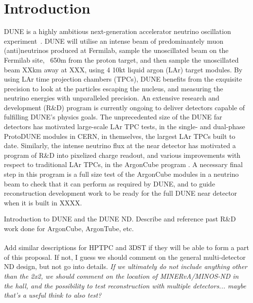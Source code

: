 \section{Introduction}
\label{sec:introduction}

DUNE is a highly ambitious next-generation accelerator neutrino oscillation experiment~\addcite. DUNE will utilise an intense beam of predominantely muon (anti)neutrinos produced at Fermilab, sample the unoscillated beam on the Fermilab site, ~650m  from the proton target, and then sample the unoscillated beam XXkm away at XXX, using 4 10kt liquid argon (LAr) target modules. By using LAr time projection chambers (TPCs), DUNE benefits from the exquisite precision to look at the particles escaping the nucleus, and measuring the neutrino energies with unparalleled precision.  An extensive research and development (R\&D) program is currently ongoing to deliver detectors capable of fulfilling DUNE's physics goals. The unprecedented size of the DUNE far detectors has motivated large-scale LAr TPC tests, in the single- and dual-phase ProtoDUNE modules in CERN, in themselves, the largest LAr TPCs built to date. Similarly, the intense neutrino flux at the near detector has motivated a program of R\&D into pixelized charge readout, and various improvements with respect to traditional LAr TPCs, in the ArgonCube program . A necessary final step in this program is a full size test of the ArgonCube modules  in a neutrino beam to check that it can perform as required by DUNE, and to guide reconstruction development work to be ready for the full DUNE near detector when it is built in XXXX.

Introduction to DUNE and the DUNE ND. Describe and reference past R\&D work done for ArgonCube, ArgonTube, etc. \\ \\

Add similar descriptions for HPTPC and 3DST if they will be able to form a part of this proposal. If not, I guess we should comment on the general multi-detector ND design, but not go into details. {\it If we ultimately do not include anything other than the 2x2, we should comment on the location of MINERvA/MINOS-ND in the hall, and the possibility to test reconstruction with multiple detectors... maybe that's a useful think to also test?}\\\\

